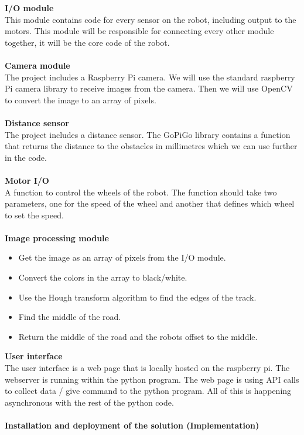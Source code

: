 \documentclass[11pt]{article}
\begin{document}
\textbf{I/O module}
\\
This module contains code for every sensor on the robot, including output to the motors. This module will be responsible for connecting every other module together, it will be the core code of the robot. 
\\\\
\textbf{Camera module}
\\
The project includes a Raspberry Pi camera. We will use the standard raspberry Pi camera library to receive images from the camera. Then we will use OpenCV to convert the image to an array of pixels.
\\\\
\textbf{Distance sensor}
\\ 
The project includes a distance sensor. The GoPiGo library contains a function that returns the distance to the obstacles in millimetres which we can use further in the code. 
\\\\
\textbf{Motor I/O}
\\
A function to control the wheels of the robot. The function should take two parameters, one for the speed of the wheel and another that defines which wheel to set the speed. 
\\\\
\textbf{Image processing module}
\\
\begin{itemize}
    \item Get the image as an array of pixels from the I/O module. 
    \item Convert the colors in the array to black/white.
    \item Use the Hough transform algorithm to find the edges of the track.
    \item Find the middle of the road.
    \item Return the middle of the road and the robots offset to the middle. 
\end{itemize}
\textbf{User interface} 
\\
The user interface is a web page that is locally hosted on the raspberry pi. The webserver is running within the python program. The web page is using API calls to collect data / give command to the python program. All of this is happening asynchronous with the rest of the python code. 
\\\\
\textbf{Installation and deployment of the solution (Implementation)}
\end{document}
